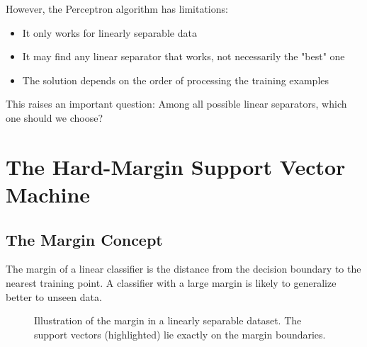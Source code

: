 \documentclass{article}
\begin{document}
However, the Perceptron algorithm has limitations:
\begin{itemize}
    \item It only works for linearly separable data
    \item It may find any linear separator that works, not necessarily the "best" one
    \item The solution depends on the order of processing the training examples
\end{itemize}

This raises an important question: Among all possible linear separators, which one should we choose?

\section{The Hard-Margin Support Vector Machine}

\subsection{The Margin Concept}
The margin of a linear classifier is the distance from the decision boundary to the nearest training point. A classifier with a large margin is likely to generalize better to unseen data.

\begin{figure}[h]
\centering
{}
\caption{Illustration of the margin in a linearly separable dataset. The support vectors (highlighted) lie exactly on the margin boundaries.}
\end{figure}
\end{document}
